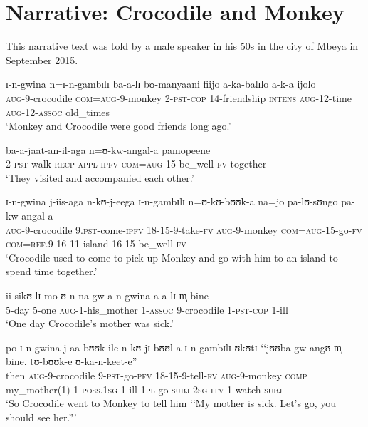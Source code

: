 \section{Narrative: Crocodile and Monkey}
\label{AppendixCrocodileMonkey}
This narrative text was told by a male speaker in his 50s in the city of Mbeya in September 2015.

\begin{exe}

\ex \gll ɪ-n-gwina n=ɪ-n-gambɪlɪ ba-a-lɪ bʊ-manyaani fiijo a-ka-balɪlo a-k-a ijolo\\
\textsc{aug}-9-crocodile \textsc{com}=\textsc{aug}-9-monkey 2-\textsc{pst}-\textsc{cop} 14-friendship \textsc{intens} \textsc{aug}-12-time \textsc{aug}-12-\textsc{assoc} old\_times\\
\glt \lq Monkey and Crocodile were good friends long ago.'

\ex \gll ba-a-jaat-an-il-aga n=ʊ-kw-angal-a pamopeene\\
2-\textsc{pst}-walk-\textsc{recp}-\textsc{appl}-\textsc{ipfv} \textsc{com}=\textsc{aug}-15-be\_well-\textsc{fv} together\\
\glt \lq They visited and accompanied each other.'

\ex \gll ɪ-n-gwina j-iis-aga n-kʊ-j-eega ɪ-n-gambɪlɪ n=ʊ-kʊ-bʊʊk-a na=jo pa-lʊ-sʊngo pa-kw-angal-a\\
\textsc{aug}-9-crocodile 9.\textsc{pst}-come-\textsc{ipfv} 18-15-9-take-\textsc{fv} \textsc{aug}-9-monkey \textsc{com}=\textsc{aug}-15-go-\textsc{fv} \textsc{com}=\textsc{ref.9} 16-11-island 16-15-be\_well-\textsc{fv}\\
\glt \lq Crocodile used to come to pick up Monkey and go with him to an island to spend time together.'

\ex \gll ii-sikʊ lɪ-mo ʊ-n-na gw-a n-gwina a-a-lɪ m̩-bine\\
5-day 5-one \textsc{aug}-1-his\_mother 1-\textsc{assoc} 9-crocodile 1-\textsc{pst}-\textsc{cop} 1-ill\\
\glt \lq One day Crocodile's mother was sick.'

\ex \gll po ɪ-n-gwina j-aa-bʊʊk-ile n-kʊ-jɪ-bʊʊl-a ɪ-n-gambɪlɪ ʊkʊtɪ \lq\lq jʊʊba gw-angʊ m̩-bine. tʊ-bʊʊk-e ʊ-ka-n-keet-e''\\
then \textsc{aug}-9-crocodile 9-\textsc{pst}-go-\textsc{pfv} 18-15-9-tell-\textsc{fv} \textsc{aug}-9-monkey \textsc{comp} \phantom{\lq\lq}my\_mother(1) 1-\textsc{poss.1sg} 1-ill \textsc{1pl}-go-\textsc{subj} \textsc{2sg}-\textsc{itv}-1-watch-\textsc{subj}\\
\glt \lq So Crocodile went to Monkey to tell him \lq\lq My mother is sick. Let's go, you should see her.''{}'


\end{exe}
